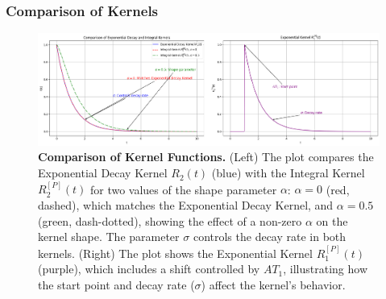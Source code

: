 %
%

\begin{frame}
  \frametitle{Comparison of Kernels}
        \begin{figure}
            \centering
            \includegraphics[width=\linewidth]{figures/method-compare.png}
            \caption{\textbf{Comparison of Kernel Functions.} 
            (Left) The plot compares the Exponential Decay Kernel \( R_2(t) \) (blue) with the Integral Kernel \( R_2^{[P]}(t) \) for two values of the shape parameter \(\alpha\): \(\alpha = 0\) (red, dashed), which matches the Exponential Decay Kernel, and \(\alpha = 0.5\) (green, dash-dotted), showing the effect of a non-zero \(\alpha\) on the kernel shape. The parameter \(\sigma\) controls the decay rate in both kernels. 
            (Right) The plot shows the Exponential Kernel \( R_1^{[P]}(t) \) (purple), which includes a shift controlled by \(AT_1\), illustrating how the start point and decay rate (\(\sigma\)) affect the kernel’s behavior.
            }
            \label{fig:comparision}
        \end{figure}
   

\end{frame}

